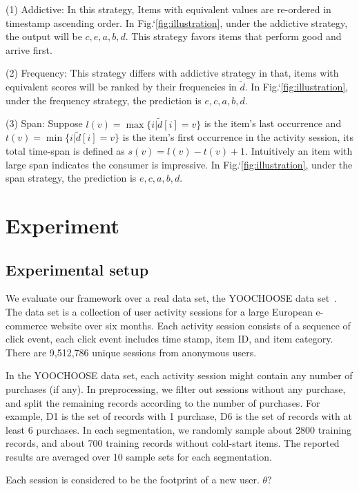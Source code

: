 \documentclass[sigconf]{acmart}
\begin{document}
(1) Addictive: In this strategy,  Items with equivalent values are re-ordered in timestamp ascending order. In Fig.`\ref{fig:illustration},  under the addictive strategy, the output will be $c,e,a,b,d$. This strategy favors items that perform good and arrive first.

(2) Frequency: This strategy differs with addictive strategy in that, items with equivalent scores will be ranked by their frequencies in $\tilde{d}$. In Fig.`\ref{fig:illustration},  under the frequency strategy, the prediction is $e,c,a,b,d$.

(3) Span: Suppose $l(v)=\max \{i|\tilde{d}[i]=v\}$ is the item's last occurrence and $t(v)=\min \{i|\tilde{d}[i]=v\} $ is the item's first occurrence in the activity session, its total time-span is defined as $s(v)=l(v)-t(v)+1$. Intuitively an item with large span indicates the  consumer is impressive. In Fig.`\ref{fig:illustration}, under the span strategy, the prediction is $e,c,a,b,d$.


\section{Experiment}\label{sec:experiment}


\subsection{Experimental setup}


We evaluate our framework over a real data set, the YOOCHOOSE data set~\cite{Ben-Shimon2015RecSys}. The data set is a collection of user activity sessions for a large
European e-commerce website over six months. Each activity session consists of a sequence of click event, each click event includes time stamp, item ID, and item category. There are 9,512,786 unique sessions from anonymous users. 

In the YOOCHOOSE data set, each activity session might contain any number of purchases (if any). In preprocessing, we filter out sessions without any purchase, and split the remaining records according to the number of purchases. For example, D1 is the set of records with 1 purchase, D6 is the set of records with at least 6 purchases. In each segmentation, we randomly sample about 2800 training records, and about 700 training records without cold-start items. The reported results are averaged over 10  sample sets for each segmentation.
  
Each session is considered to be the footprint of a new user. $\theta$?
\end{document}
